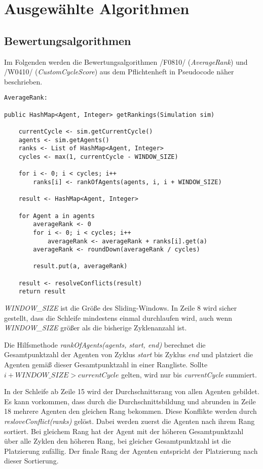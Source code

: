 \section{Ausgewählte Algorithmen}

\subsection{Bewertungsalgorithmen}

Im Folgenden werden die Bewertungsalgorithmen /F0810/ (\emph{AverageRank}) und /W0410/ (\emph{CustomCycleScore}) aus dem Pflichtenheft in Pseudocode näher beschrieben. 

\begin{lstlisting}
AverageRank:

public HashMap<Agent, Integer> getRankings(Simulation sim) 
	
	currentCycle <- sim.getCurrentCycle()
	agents <- sim.getAgents()
	ranks <- List of HashMap<Agent, Integer>	
	cycles <- max(1, currentCycle - WINDOW_SIZE)
	
	for i <- 0; i < cycles; i++ 
		ranks[i] <- rankOfAgents(agents, i, i + WINDOW_SIZE)
	
	result <- HashMap<Agent, Integer>	
	
	for Agent a in agents
		averageRank <- 0
		for i <- 0; i < cycles; i++
			averageRank <- averageRank + ranks[i].get(a)
		averageRank <- roundDown(averageRank / cycles)
		
		result.put(a, averageRank)
	
	result <- resolveConflicts(result)
	return result
\end{lstlisting}

\emph{WINDOW\_SIZE} ist die Größe des Sliding-Windows. In Zeile 8 wird sicher gestellt, dass die Schleife mindestens einmal durchlaufen wird, auch wenn \emph{WINDOW\_SIZE} größer als die bisherige Zyklenanzahl ist.

Die Hilfsmethode \emph{rankOfAgents(agents, start, end)} berechnet die Gesamtpunktzahl der Agenten von Zyklus \emph{start} bis Zyklus \emph{end} und platziert die Agenten gemäß dieser Gesamtpunktzahl in einer Rangliste. Sollte $i + WINDOW\_SIZE > currentCycle$ gelten, wird nur bis \emph{currentCycle} summiert. 

In der Schleife ab Zeile 15 wird der Durchschnittsrang von allen Agenten gebildet. Es kann vorkommen, dass durch die Durchschnittsbildung und abrunden in Zeile 18 mehrere Agenten den gleichen Rang bekommen. Diese Konflikte werden durch \emph{resloveConflict(ranks)} gelöst. Dabei werden zuerst die Agenten nach ihrem Rang sortiert. Bei gleichem Rang hat der Agent mit der höheren Gesamtpunktzahl über alle Zyklen den höheren Rang, bei gleicher Gesamtpunktzahl ist die Platzierung zufällig. Der finale Rang der Agenten entspricht der Platzierung nach dieser Sortierung.

